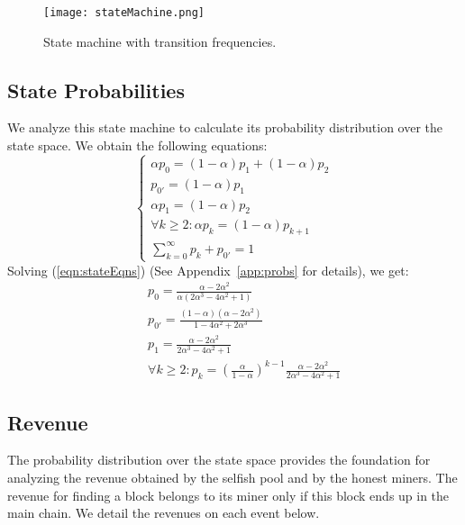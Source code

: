\documentclass[letterpaper]{llncs}
\begin{document}
\begin{figure}[!t] 
\centering
\texttt{[image: stateMachine.png]}
\caption{ 
State machine with transition frequencies. 
} 
\label{fig:stateMachine} 
\end{figure}

        \subsection{State Probabilities}

We analyze this state machine to calculate its probability distribution over the state space. We obtain the following equations: 
\begin{equation} 
\left\{ \begin{array}{l}
\alpha p_0 = (1-\alpha) p_1 + (1-\alpha) p_2 \\
p_{0'} = (1 - \alpha) p_1 \\
\alpha p_1 = (1-\alpha) p_2 \\
\forall k \ge 2: \alpha p_k = (1-\alpha) p_{k+1} \\
\sum_{k=0}^\infty p_k + p_{0'} = 1 
\end{array} \right.
\label{eqn:stateEqns} 
\end{equation} 
Solving (\ref{eqn:stateEqns}) (See Appendix~\ref{app:probs} for details), we get: 
\begin{eqnarray}
&& p_0 = \frac{\alpha-2 \alpha^2}{\alpha(2\alpha^3 - 4\alpha^2 + 1)} \label{eqn:pFirst} \\
&& p_{0'} = \frac{(1 - \alpha)(\alpha - 2 \alpha^2)}{1 - 4\alpha^2 + 2\alpha^3} \\
&& p_1 = \frac{\alpha-2 \alpha^2}{2\alpha^3 - 4\alpha^2 + 1} \\
&& \forall k \ge 2: p_k =  \left( \frac{\alpha}{1-\alpha} \right)^{k-1} \frac{\alpha-2 \alpha^2}{2\alpha^3 - 4\alpha^2 + 1} \label{eqn:pLast}
\end{eqnarray} 

        \subsection{Revenue} 

The probability distribution over the state space provides the foundation for analyzing the revenue obtained by the selfish pool and by the honest miners. The revenue for finding a block belongs to its miner only if this block ends up in the main chain. We detail the revenues on each event below.
\end{document}
